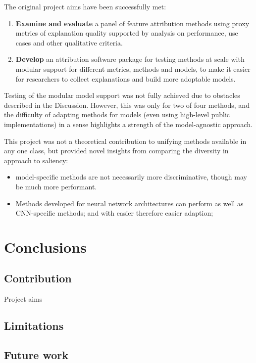 \documentclass[main]{subfiles}
\begin{document}
The original project aims have been successfully met:
\begin{enumerate}
	\item \textbf{Examine and evaluate} a panel of feature attribution methods using proxy metrics of explanation quality supported by analysis on performance, use cases and other qualitative criteria.

	\item \textbf{Develop} an attribution software package for testing methods at scale with modular support for different metrics, methods and models, to make it easier for researchers to collect explanations and build more adoptable models.

\end{enumerate}
Testing of the modular model support was not fully achieved due to obstacles described in the Discussion. However, this was only for two of four methods, and the difficulty of adapting methods for models (even using high-level public implementations) in a sense highlights a strength of the model-agnostic approach.

This project was not a theoretical contribution to unifying methods available in any one class, but provided novel insights from comparing the diversity in approach to saliency:

\begin{itemize}
\item model-specific methods are not necessarily more discriminative, though may be much more performant.
\item Methods developed for neural network architectures can perform as well as CNN-specific methods; and with easier therefore easier adaption;
\end{itemize}


\chapter{Conclusions}

\section{Contribution}
Project aims

\section{Limitations}

\section{Future work}
\end{document}

